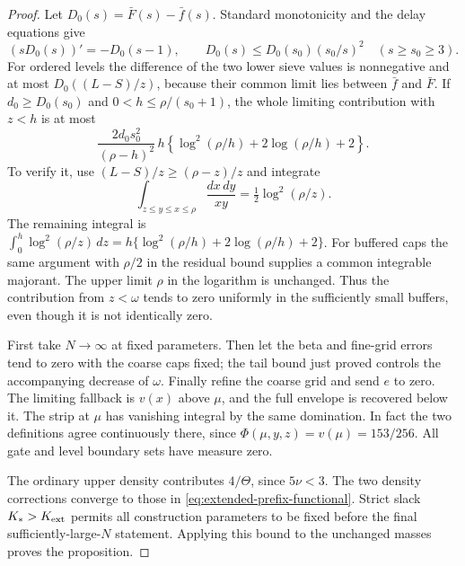 \begin{proof}
Let $D_0(s)=\bar F(s)-\bar f(s)$. Standard monotonicity and
the delay equations give
\[
 (sD_0(s))'=-D_0(s-1),\qquad
 D_0(s)\le D_0(s_0)(s_0/s)^2\quad(s\ge s_0\ge3).
\]
For ordered levels the difference of the two lower sieve values
is nonnegative and at most $D_0((L-S)/z)$, because their common
limit lies between $\bar f$ and $\bar F$.
If $d_0\ge D_0(s_0)$ and $0<h\le\rho/(s_0+1)$, the whole
limiting contribution with $z<h$ is at most
\begin{equation}\label{eq:extended-prefix-tail-bound}
 \frac{2d_0s_0^2}{(\rho-h)^2}\,h
 \left\{\log^2(\rho/h)+2\log(\rho/h)+2\right\}.
\end{equation}
To verify it, use $(L-S)/z\ge(\rho-z)/z$ and integrate
\[
 \int_{z\le y\le x\le\rho}\frac{dx\,dy}{xy}
                       =\tfrac12\log^2(\rho/z).
\]
The remaining integral is
$\int_0^h\log^2(\rho/z)\,dz
=h\{\log^2(\rho/h)+2\log(\rho/h)+2\}$.
For buffered caps the same argument with $\rho/2$ in the
residual bound supplies a common integrable majorant. The upper
limit $\rho$ in the logarithm is unchanged. Thus the contribution
from $z<\omega$ tends to zero uniformly in the sufficiently small
buffers, even though it is not identically zero.

First take $N\to\infty$ at fixed parameters. Then let the beta
and fine-grid errors tend to zero with the coarse caps fixed;
the tail bound just proved controls the accompanying decrease
of $\omega$. Finally refine the coarse grid and send $e$ to zero.
The limiting fallback is $v(x)$ above $\mu$, and the full envelope
is recovered below it. The strip at $\mu$ has vanishing integral
by the same domination. In fact the two definitions agree
continuously there, since $\Phi(\mu,y,z)=v(\mu)=153/256$.
All gate and level boundary sets have measure zero.

The ordinary upper density contributes $4/\Theta$, since
$5\nu<3$. The two density corrections converge to those in
\eqref{eq:extended-prefix-functional}. Strict slack
$K_*>K_{\rm ext}$ permits all construction parameters to be
fixed before the final sufficiently-large-$N$ statement. Applying
this bound to the unchanged masses proves the proposition.
\end{proof}
